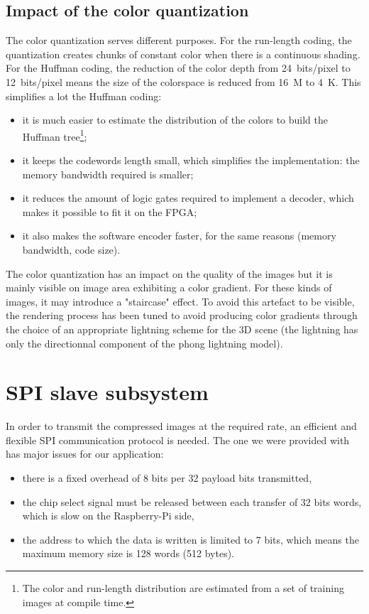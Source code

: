 \documentclass[english, DIV=13]{scrreprt}
\begin{document}
\subsection{Impact of the color quantization}

The color quantization serves different purposes. For the run-length coding,
the quantization creates chunks of constant color when there is a
continuous shading. For the Huffman
coding, the reduction of the color depth from \SI{24}{bits/pixel} to
\SI{12}{bits/pixel} means the size of the colorspace is reduced from
\SI{16}{M} to \SI{4}{K}. This simplifies a lot the Huffman coding:
\begin{itemize}
    \item it is much easier to estimate the distribution of the colors
    to build the Huffman tree\footnote{The color and run-length distribution are
    estimated from a set of training images at compile time.};
    \item it keeps the codewords length small, which simplifies the implementation:
    the memory bandwidth required is smaller;
    \item it reduces the amount of logic gates required to implement a decoder,
    which makes it possible to fit it on the FPGA;
    \item it also makes the software encoder faster, for the same reasons
    (memory bandwidth, code size).
\end{itemize}

The color quantization has an impact on the quality of the images
but it is mainly visible on image area exhibiting a color gradient.
For these kinds of images,
it may introduce a "staircase" effect. To avoid this artefact to be visible,
the rendering process has been tuned to avoid producing color gradients
through the choice of an appropriate lightning scheme for the 3D scene (the lightning
has only the directionnal component of the phong lightning model).

\section{SPI slave subsystem}
\label{sec:spi}

In order to transmit the compressed images at the required rate, an efficient and
flexible SPI communication protocol is needed.
The one we were provided with has major issues for our application:
\begin{itemize}
    \item there is a fixed overhead of 8 bits per 32 payload bits transmitted,
    \item the chip select signal must be released between each transfer of 32 bits
    words, which is slow on the Raspberry-Pi side,
    \item the address to which the data is written is limited to 7 bits, which means
    the maximum memory size is 128 words (512 bytes).
\end{itemize}
\end{document}
